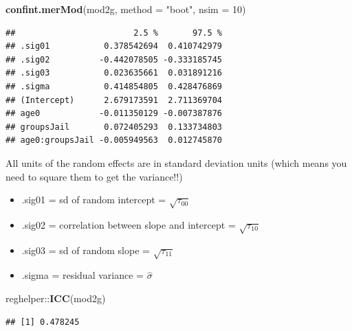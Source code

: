 \documentclass[ignorenonframetext,]{beamer}
\newenvironment{Shaded}{\begin{snugshade}}{\end{snugshade}}
\newcommand{\KeywordTok}[1]{\textcolor[rgb]{0.13,0.29,0.53}{\textbf{{#1}}}}
\newcommand{\DataTypeTok}[1]{\textcolor[rgb]{0.13,0.29,0.53}{{#1}}}
\newcommand{\DecValTok}[1]{\textcolor[rgb]{0.00,0.00,0.81}{{#1}}}
\newcommand{\StringTok}[1]{\textcolor[rgb]{0.31,0.60,0.02}{{#1}}}
\newcommand{\NormalTok}[1]{{#1}}
\begin{document}
\begin{frame}[fragile]

\footnotesize

\begin{Shaded}
\begin{Highlighting}[]
\KeywordTok{confint.merMod}\NormalTok{(mod2g, }\DataTypeTok{method =} \StringTok{"boot"}\NormalTok{, }\DataTypeTok{nsim =} \DecValTok{10}\NormalTok{)}
\end{Highlighting}
\end{Shaded}

\begin{verbatim}
##                        2.5 %       97.5 %
## .sig01           0.378542694  0.410742979
## .sig02          -0.442078505 -0.333185745
## .sig03           0.023635661  0.031891216
## .sigma           0.414854805  0.428476869
## (Intercept)      2.679173591  2.711369704
## age0            -0.011350129 -0.007387876
## groupsJail       0.072405293  0.133734803
## age0:groupsJail -0.005949563  0.012745870
\end{verbatim}

All units of the random effects are in standard deviation units (which
means you need to square them to get the variance!!)\\

\begin{itemize}
  \item .sig01 = sd of random intercept = $\sqrt{\tau_{00}}$  
  \item .sig02 = correlation between slope and intercept = $\sqrt{\tau_{10}}$  
  \item .sig03 = sd of random slope = $\sqrt{\tau_{11}}$  
  \item .sigma = residual variance = $\hat{\sigma}$  
\end{itemize}

\end{frame}

\begin{frame}[fragile]

\small

\begin{Shaded}
\begin{Highlighting}[]
\NormalTok{reghelper::}\KeywordTok{ICC}\NormalTok{(mod2g)}
\end{Highlighting}
\end{Shaded}

\begin{verbatim}
## [1] 0.478245
\end{verbatim}

\end{frame}
\end{document}
